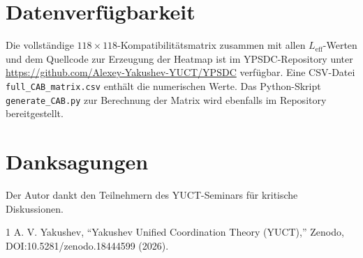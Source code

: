 \documentclass[11pt,a4paper]{article}
\begin{document}
	\section*{Datenverfügbarkeit}
	Die vollständige \(118\times118\)-Kompatibilitätsmatrix zusammen mit allen \(L_{\mathrm{eff}}\)-Werten und dem Quellcode zur Erzeugung der Heatmap ist im YPSDC-Repository unter \url{https://github.com/Alexey-Yakushev-YUCT/YPSDC} verfügbar. Eine CSV-Datei \texttt{full\_CAB\_matrix.csv} enthält die numerischen Werte. Das Python-Skript \texttt{generate\_CAB.py} zur Berechnung der Matrix wird ebenfalls im Repository bereitgestellt.
	
	\section*{Danksagungen}
	Der Autor dankt den Teilnehmern des YUCT-Seminars für kritische Diskussionen.
	
	
	\begin{thebibliography}{1}
		 A. V. Yakushev, ``Yakushev Unified Coordination Theory (YUCT),'' Zenodo, DOI:10.5281/zenodo.18444599 (2026).
	\end{thebibliography}
	
\end{document}
